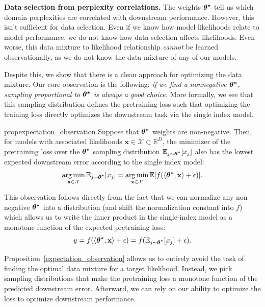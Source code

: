 \documentclass{article} %
\begin{document}
\textbf{Data selection from perplexity correlations.} The weights $\bm{{\bf{\theta}^*}}$ tell us which domain perplexities are correlated with downstream performance. However, this isn't sufficient for data selection. Even if we know how model likelihoods relate to model performance, we do not know how data selection affects likelihoods. Even worse, this data mixture to likelihood relationship \emph{cannot} be learned observationally, as we do not know the data mixture of any of our models.

Despite this, we show that there is a clean approach for optimizing the data mixture. Our core observation is the following: \emph{if we find a nonnegative $\bm{{\bf{\theta}^*}}$, sampling proportional to $\bm{{\bf{\theta}^*}}$ is always a good choice.} More formally, we see that this sampling distribution defines the pretraining loss such that optimizing the training loss directly optimizes the downstream task via the single index model.
\begin{restatable}{prop}{expectation_observation} 
\label{expectation_observation}
Suppose that $\bm{{\bf{\theta}^*}}$ weights are non-negative. Then, for models with associated likelihoods $\mathbf{x} \in \mathcal{X}\subset \mathbb{R}^{D}$, the minimizer of the pretraining loss over the $\bm{{\bf{\theta}^*}}$ sampling distribution $\mathbb{E}_{j\sim \bm{{\bf{\theta}^*}}}[x_j]$ also has the lowest expected downstream error according to the single index model:
\[\operatorname*{arg\,min}_{\mathbf{x}\in\mathcal{X}} \mathbb{E}_{j\sim \bm{{\bf{\theta}^*}}}[x_j]=\operatorname*{arg\,min}_{\mathbf{x}\in\mathcal{X}} \mathbb{E}[f(\langle \bm{{\bf{\theta}^*}}, \mathbf{x}\rangle +\epsilon)].\]
\end{restatable}
This observation follows directly from the fact that we can normalize any non-negative $\bm{{\bf{\theta}^*}}$ into a distribution (and shift the normalization constant into $f$) which allows us to write the inner product in the single-index model as a monotone function of the expected pretraining loss:
\begin{equation}
y = f(\langle \bm{{\bf{\theta}^*}},\mathbf{x}\rangle + \epsilon) = f(\mathbb{E}_{j \sim \bm{{\bf{\theta}^*}}}[x_j] + \epsilon).
\end{equation}

Proposition~\ref{expectation_observation} allows us to entirely avoid the task of finding the optimal data mixture for a target likelihood. Instead, we pick sampling distributions that make the pretraining loss a monotone function of the predicted downstream error. Afterward, we can rely on our ability to optimize the loss to optimize downstream performance. 
\end{document}
